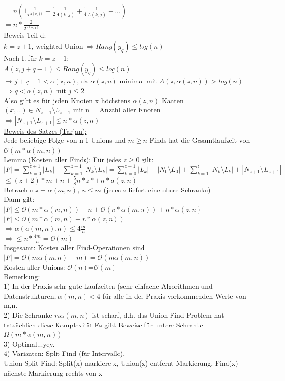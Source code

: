 \documentclass[a4paper]{article}
\newcommand{\oh}[1]{$\mathcal{O}(#1)$}
\begin{document}
$= n (1\frac{1}{2^{A(k,j)}} + \frac{1}{2}\frac{1}{{A(k,j)}}+\frac{1}{4}\frac{1}{{A(k,j)}}+...)$\\
$= n*\frac{2}{2^{A(k,j)}}$\\
Beweis Teil d:\\
$k=z+1$, weighted Union $\Rightarrow Rang(y_q) \leq log(n)$\\
Nach I. für $k=z+1$:\\
$A(z,j+q-1) \leq Rang(y_q)\leq log(n)$\\
$\Rightarrow j+q-1 < \alpha (z,n)$, da $\alpha (z,n)$ minimal mit $A(z,\alpha (z,n))>log(n)$\\
$\Rightarrow q < \alpha (z,n)$ mit $j\leq 2$\\
Also gibt es für jeden Knoten x höchstens $\alpha (z,n)$ Kanten $(x,..)\in N_{z+1}\setminus L_{z+1}$ mit n = Anzahl aller Knoten\\
$\Rightarrow |N_{z+1}\setminus L_{z+1} | \leq n*\alpha (z,n)$\\
\underline{Beweis des Satzes (Tarjan):}\\
Jede beliebige Folge von n-1 Unions und $m\geq n$ Finds hat die Gesamtlaufzeit von \oh{m*\alpha (m,n)}\\
Lemma (Kosten aller Finds): Für jedes $z\geq 0$ gilt:\\
 $|F| = \sum_{k=0}^{z+1} |L_k | + \sum_{k=1}^{z+1} |N_k\setminus L_k | = \sum_{k=0}^{z+1} | L_k | + |N_0\setminus L_0 |+\sum_{k=1}^{z} |N_k\setminus L_k | + |N_{z+1}\setminus L_{z+1}|$\\
 $\leq (z+2)*m +n + \frac{5}{8}n*z* + n*\alpha (z,n)$\\
 Betrachte $z=\alpha (m,n),\ n\leq m$ (jedes z liefert eine obere Schranke)\\
 Dann gilt: \\
 $|F|\leq \mathcal{O}(m*\alpha (m,n))+ n+\mathcal{O}(n*\alpha (m,n))+n*\alpha (z,n)$\\
 $|F|\leq \mathcal{O}(m*\alpha(m,n)+n*\alpha(z,n))$\\
 $\Rightarrow \alpha(\alpha(m,n),n) \leq 4\frac{m}{n}$\\
 $\Rightarrow \leq n*\frac{4m}{n} = \mathcal{O}(m)$\\
 Insgesamt: Kosten aller Find-Operationen sind $|F| = \mathcal{O}(m\alpha(m,n)+m)=\mathcal{O}(m\alpha(m,n))$\\
 Kosten aller Unions: \oh{n}=\oh{m}\\
 Bemerkung:\\
 1) In der Praxis sehr gute Laufzeiten (sehr einfache Algorithmen und Datenstrukturen, $\alpha (m,n) < 4 $ für alle in der Praxis vorkommenden Werte von m,n.\\
 2) Die Schranke $m\alpha(m,n)$ ist scharf, d.h. das Union-Find-Problem hat tatsächlich diese Komplexität.Es gibt Beweise für untere Schranke $\Omega(m*\alpha(m,n))$\\
 3) Optimal...yey.\\
 4) Varianten: Split-Find (für Intervalle), \\
 Union-Split-Find: Split(x) markiere x, Union(x) entfernt Markierung, Find(x) nächste Markierung rechts von x\\
\end{document}
